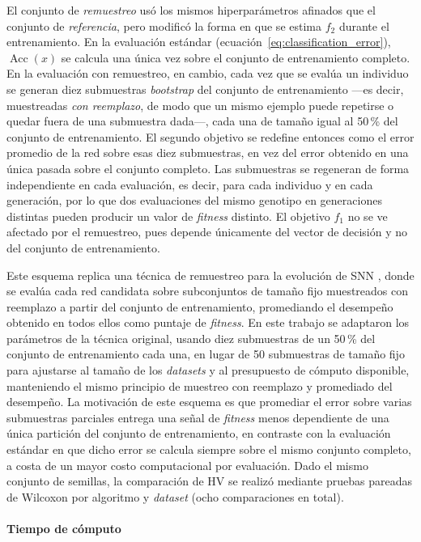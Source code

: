 El conjunto de \textit{remuestreo} usó los mismos hiperparámetros afinados que el conjunto de \textit{referencia}, pero modificó la forma en que se estima $f_2$ durante el entrenamiento. En la evaluación estándar (ecuación~\ref{eq:classification_error}), $\operatorname{Acc}(x)$ se calcula una única vez sobre el conjunto de entrenamiento completo. En la evaluación con remuestreo, en cambio, cada vez que se evalúa un individuo se generan diez submuestras \textit{bootstrap} del conjunto de entrenamiento —es decir, muestreadas \emph{con reemplazo}, de modo que un mismo ejemplo puede repetirse o quedar fuera de una submuestra dada—, cada una de tamaño igual al 50\,\% del conjunto de entrenamiento. El segundo objetivo se redefine entonces como el error promedio de la red sobre esas diez submuestras, en vez del error obtenido en una única pasada sobre el conjunto completo. Las submuestras se regeneran de forma independiente en cada evaluación, es decir, para cada individuo y en cada generación, por lo que dos evaluaciones del mismo genotipo en generaciones distintas pueden producir un valor de \textit{fitness} distinto. El objetivo $f_1$ no se ve afectado por el remuestreo, pues depende únicamente del vector de decisión y no del conjunto de entrenamiento.

Este esquema replica una técnica de remuestreo para la evolución de SNN \cite{LoyolaJara2026evolvingsnn}, donde se evalúa cada red candidata sobre subconjuntos de tamaño fijo muestreados con reemplazo a partir del conjunto de entrenamiento, promediando el desempeño obtenido en todos ellos como puntaje de \textit{fitness}. En este trabajo se adaptaron los parámetros de la técnica original, usando diez submuestras de un 50\,\% del conjunto de entrenamiento cada una, en lugar de 50 submuestras de tamaño fijo para ajustarse al tamaño de los \textit{datasets} y al presupuesto de cómputo disponible, manteniendo el mismo principio de muestreo con reemplazo y promediado del desempeño. La motivación de este esquema es que promediar el error sobre varias submuestras parciales entrega una señal de \textit{fitness} menos dependiente de una única partición del conjunto de entrenamiento, en contraste con la evaluación estándar en que dicho error se calcula siempre sobre el mismo conjunto completo, a costa de un mayor costo computacional por evaluación. Dado el mismo conjunto de semillas, la comparación de HV se realizó mediante pruebas pareadas de Wilcoxon por algoritmo y \textit{dataset} (ocho comparaciones en total).

\paragraph{Tiempo de cómputo}

